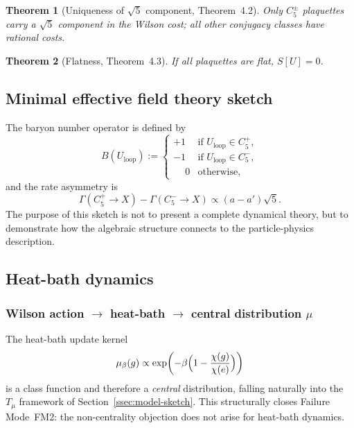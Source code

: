 \documentclass[sn-mathphys-num,Numbered]{sn-jnl}
\theoremstyle{thmstyleone}
\newtheorem{theorem}{Theorem}[section]
\theoremstyle{thmstylethree}
\theoremstyle{thmstyletwo}
\begin{document}
\begin{theorem}[Uniqueness of $\sqrt{5}$ component, Theorem~4.2]
\label{thm:sqrt5-unique}
Only $C_5^\pm$ plaquettes carry a $\sqrt{5}$ component in the Wilson
cost; all other conjugacy classes have rational costs.
\end{theorem}

\begin{theorem}[Flatness, Theorem~4.3]
\label{thm:flatness}
If all plaquettes are flat, $S[U] = 0$.
\end{theorem}


\subsection{Minimal effective field theory sketch}
\label{ssec:eft}

The baryon number operator is defined by
\begin{equation}
  B(U_{\mathrm{loop}}) :=
  \begin{cases}
    +1 & \text{if } U_{\mathrm{loop}} \in C_5^+, \\
    -1 & \text{if } U_{\mathrm{loop}} \in C_5^-, \\
    \phantom{+}0 & \text{otherwise,}
  \end{cases}
  \label{eq:baryon-op}
\end{equation}
and the rate asymmetry is
\begin{equation}
  \Gamma(C_5^+ \to X) - \Gamma(C_5^- \to X) \propto (a - a')\sqrt{5}.
  \label{eq:rate-asymmetry}
\end{equation}
The purpose of this sketch is not to present a complete dynamical
theory, but to demonstrate how the algebraic structure connects to the
particle-physics description.

\subsection{Heat-bath dynamics}
\label{ssec:heatbath}

\subsubsection{Wilson action $\to$ heat-bath $\to$ central distribution $\mu$}
\label{sssec:heatbath-central}

The heat-bath update kernel
\begin{equation}
  \mu_\beta(g) \propto \exp\!\left(-\beta\Bigl(1 - \frac{\chi(g)}{\chi(e)}\Bigr)\right)
  \label{eq:heatbath}
\end{equation}
is a class function and therefore a \emph{central} distribution,
falling naturally into the $T_\mu$ framework of
Section~\ref{ssec:model-sketch}.  This structurally closes Failure
Mode~FM2: the non-centrality objection does not arise for heat-bath
dynamics.
\end{document}
